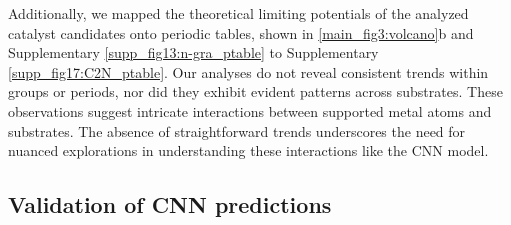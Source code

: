 \documentclass[a4paper, 12pt, titlepage]{article}
\begin{document}
Additionally, we mapped the theoretical limiting potentials of the analyzed catalyst candidates onto periodic tables, shown in \cref{main_fig3:volcano}b and Supplementary \cref{supp_fig13:n-gra_ptable} to Supplementary \cref{supp_fig17:C2N_ptable}.
Our analyses do not reveal consistent trends within groups or periods, nor did they exhibit evident patterns across substrates.
These observations suggest intricate interactions between supported metal atoms and substrates.
The absence of straightforward trends underscores the need for nuanced explorations in understanding these interactions like the CNN model.


\subsection{Validation of CNN predictions}
\end{document}
